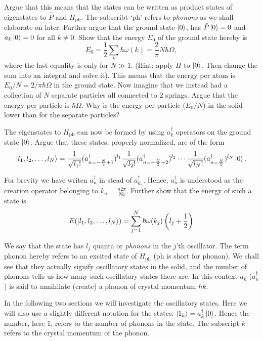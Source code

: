 \documentclass[10pt]{article}
\begin{document}
Argue that this means that the states can be written as product states of eigenstates to $\hat{P}$ and $H_{\text{ph}}$. The subscribt `ph' refers to \textit{phonons} as we shall elaborate on later. Further argue that the ground state $\ket{0}$, has $\hat{P}\ket{0} = 0$ and $a_k\ket{0}=0$ for all $k\neq 0$. Show that the energy $E_0$ of the ground state hereby is
\begin{equation}
E_0 = \frac{1}{2}\sum_k\hbar\omega(k) = \frac{2}{\pi}N\hbar\Omega,
\end{equation}
where the last equality is only for $N\gg 1$. (Hint: apply $H$ to $\ket{0}$. Then change the sum into an integral and solve it). This means that the energy per atom is $E_0/N = 2/\pi \hbar\Omega$ in the ground state. Now imagine that we instead had a collection of $N$ separate particles all connected to 2 springs. Argue that the energy per particle is $\hbar \Omega$. Why is the energy per particle ($E_0/N$) in the solid lower than for the separate particles? 

The eigenstates to $H_{\text{ph}}$ can now be formed by using $a_k^\dagger$ operators on the ground state $\ket{0}$. Argue that these states, properly normalized, are of the form
\begin{equation}
\ket{l_1, l_2, \dots, l_N} = \frac{1}{\sqrt{l_1!}}(a_{n=-\frac{N}{2}+1}^\dagger)^{l_1}\frac{1}{\sqrt{l_2!}}(a_{n=-\frac{N}{2}+2}^\dagger)^{l_2}\cdots \frac{1}{\sqrt{l_N!}}(a_{n=\frac{N}{2}}^\dagger)^{l_N}\ket{0}. 
\end{equation}

For brevity we have writen $a^\dagger_n$ in stead of $a^\dagger_{k_n}$. Hence, $a^\dagger_n$ is understood as the creation operator belonging to $k_n = \frac{n 2\pi}{Na}$. Further show that the energy of such a state is
\begin{equation}
E(\ket{l_1, l_2, \dots, l_N}) = \sum_{j=1}^{N}\hbar\omega(k_j)\left(l_j+\frac{1}{2}\right)
\end{equation}

We say that the state has $l_j$ quanta or \textit{phonons} in the $j$'th oscillator. The term phonon hereby refers to an excited state of $H_\text{ph}$ (ph is short for phonon). We shall see that they actually signify oscillatory states in the solid, and the number of phonons tells us how many such oscillatory states there are. In this context $a_k$ ($a_k^\dagger$) is said to annihilate (create) a phonon of crystal momentum $\hbar k$. 

In the following two sections we will investigate the oscillatory states. Here we will also use a slightly different notation for the states: $\ket{1_k} = a^\dagger_k \ket{0}$. Hence the number, here 1, refers to the number of phonons in the state. The subscript $k$ refers to the crystal momentum of the phonon.  
\end{document}
